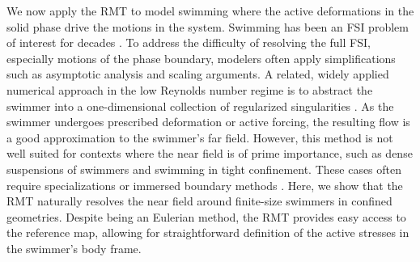 \documentclass[times, 10pt]{article}
\renewcommand{\vec}[1]{\mathbf{#1}}
\newcommand{\vx}{\vec{x}}
\newcommand{\vX}{\vec{X}}
\newcommand{\vxi}{\boldsymbol\xi}
\newcommand\llnote[1]{\textcolor{blue!50!black}{[LL: #1]}}
\begin{document}
\begin{multicols}{2}
We now apply the RMT to model swimming where the active deformations in the solid phase drive the motions in the system.
Swimming has been an FSI problem of interest for decades \cite{taylor51,purcell77,lighthill1976}. To address the difficulty of resolving the full FSI, especially motions of the phase boundary, modelers often apply simplifications such as asymptotic analysis and scaling arguments.
A related, widely applied numerical approach in the low Reynolds number regime is to abstract the swimmer into a one-dimensional collection of regularized singularities \cite{lim2019, olson2020, shelley2000, medovikov2005, leiderman2016,fauci2017}.
As the swimmer undergoes prescribed deformation or active forcing, the resulting flow is a good approximation to the swimmer's far field.
However, this method is not well suited for contexts where the near field is of prime importance, such as dense suspensions of swimmers and swimming in tight confinement.
These cases often require specializations \cite{nguyen2019,gaffney2019} or immersed boundary methods \cite{kanso2018,arash2020}.
Here, we show that the RMT naturally resolves the near field around finite-size swimmers in confined geometries.
Despite being an Eulerian method, the RMT provides easy access to the reference map, allowing for straightforward definition of the active stresses in the swimmer's body frame.



\end{multicols}
\end{document}
